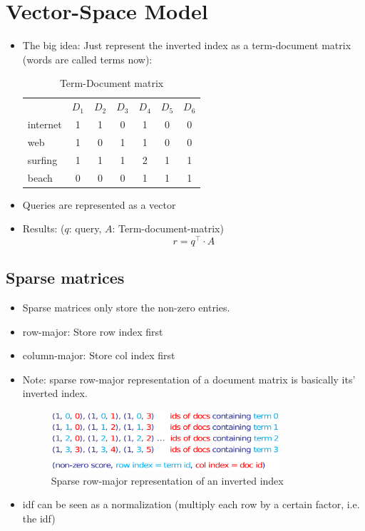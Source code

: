 \documentclass[a4paper]{scrartcl}
\newcommand{\blu}[1]{\textcolor{mainblue}{#1}}
\begin{document}
\section{Vector-Space Model}
\label{sec:vector_space_model}
\begin{itemize}
\item The big idea: Just represent the inverted index as a term-document matrix
  (words are called terms now):
  \begin{table}[h!tbp]
    \centering
    \begin{tabular}{lcccccc}
      &$D_1$&$D_2$&$D_3$&$D_4$&$D_5$&$D_6$ \\
      internet & 1 & 1 & 0& 1 & 0 & 0 \\
      web & 1 & 0 & 1 & 1 & 0 & 0\\
      surfing & 1 & 1 & 1 & 2 & 1 & 1 \\
      beach & 0 & 0 & 0 & 1 & 1 & 1\\
    \end{tabular}
    \caption{Term-Document matrix}
    \label{tab:term_document_matrix}
  \end{table}
\item Queries are represented as a vector
\item Results: ($q$: query, $A$: Term-document-matrix)
  \begin{equation}
    \label{eq:vsm_result}
     r = q^\top \cdot A
  \end{equation}
\end{itemize}

\subsection{Sparse matrices}
\label{sec:sparse_matrices}
\begin{itemize}
\item Sparse matrices only store the non-zero entries.
\item row-major: Store row index first
\item column-major: Store col index first
\item Note: sparse row-major representation of a document matrix is basically
  its' \blu{inverted index}.
  \begin{figure}[h!tbp]
    \centering
    \includegraphics[width=0.8\textwidth]{figures/sparse_ii}
    \caption{Sparse row-major representation of an inverted index}
    \label{fig:sparse_ii}
  \end{figure}
\item idf can be seen as a normalization (multiply each row by a certain factor,
  i.e. the idf)
\end{itemize}
\end{document}
